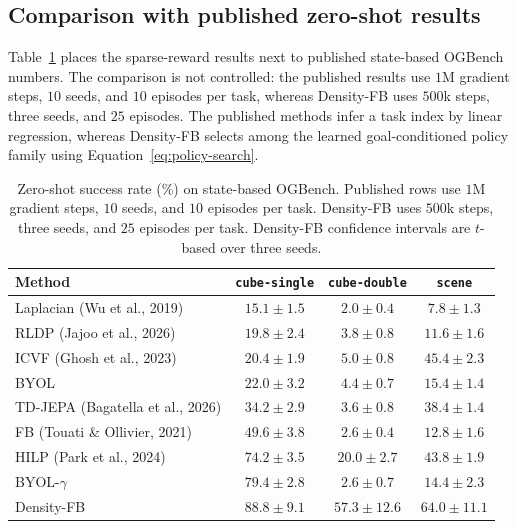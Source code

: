\documentclass[11pt]{article}
\newcommand{\DensityFB}{Density-FB}
\begin{document}
\subsection{Comparison with published zero-shot results}

Table~\ref{tab:published} places the sparse-reward results next to published state-based OGBench numbers. The comparison is not controlled: the published results use $1$M gradient steps, $10$ seeds, and $10$ episodes per task, whereas Density-FB uses $500$k steps, three seeds, and $25$ episodes. The published methods infer a task index by linear regression, whereas Density-FB selects among the learned goal-conditioned policy family using Equation~\eqref{eq:policy-search}.

\begin{table}[h]
\centering
\small
\begin{tabular}{lccc}
\toprule
Method & \texttt{cube-single} & \texttt{cube-double} & \texttt{scene} \\
\midrule
Laplacian (Wu et al., 2019) & $15.1 \pm 1.5$ & $2.0 \pm 0.4$ & $7.8 \pm 1.3$ \\
RLDP (Jajoo et al., 2026) & $19.8 \pm 2.4$ & $3.8 \pm 0.8$ & $11.6 \pm 1.6$ \\
ICVF (Ghosh et al., 2023) & $20.4 \pm 1.9$ & $5.0 \pm 0.8$ & $45.4 \pm 2.3$ \\
BYOL & $22.0 \pm 3.2$ & $4.4 \pm 0.7$ & $15.4 \pm 1.4$ \\
TD-JEPA (Bagatella et al., 2026) & $34.2 \pm 2.9$ & $3.6 \pm 0.8$ & $38.4 \pm 1.4$ \\
FB (Touati \& Ollivier, 2021) & $49.6 \pm 3.8$ & $2.6 \pm 0.4$ & $12.8 \pm 1.6$ \\
HILP (Park et al., 2024) & $74.2 \pm 3.5$ & $20.0 \pm 2.7$ & $43.8 \pm 1.9$ \\
BYOL-$\gamma$ & $79.4 \pm 2.8$ & $2.6 \pm 0.7$ & $14.4 \pm 2.3$ \\
\midrule
\DensityFB{} & $\mathbf{88.8 \pm 9.1}$ & $\mathbf{57.3 \pm 12.6}$ & $\mathbf{64.0 \pm 11.1}$ \\
\bottomrule
\end{tabular}
\caption{Zero-shot success rate (\%) on state-based OGBench. Published rows use $1$M gradient steps, $10$ seeds, and $10$ episodes per task. Density-FB uses $500$k steps, three seeds, and $25$ episodes per task. Density-FB confidence intervals are $t$-based over three seeds.}
\label{tab:published}
\end{table}


\appendix
\end{document}
